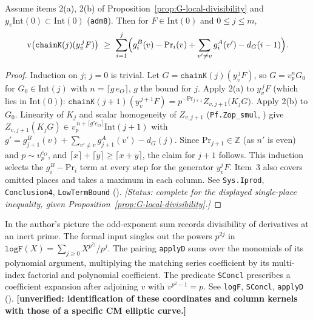 \begin{lemma}\label{lem:G-one-y-per-column}
Assume items 2(a), 2(b) of Proposition~\ref{prop:G-local-divisibility} and $y_v\mathrm{Int}(0)\subset\mathrm{Int}(0)$
(\texttt{adm8}). Then for $F\in\mathrm{Int}(0)$ and $0\le j\le m$,
\[
  \mathrm v\bigl(\texttt{chainK}(j)(y_v^{\,j}F)\bigr)\ \ge\ \sum_{i=1}^{j}\Bigl(g^B_i(v)-\mathrm{Pr}_i(v)+\sum_{v'\ne v}g^A_i(v')-d_G(i-1)\Bigr).
\]
\end{lemma}
\begin{proof}
Induction on $j$; $j=0$ is trivial. Let $G=\texttt{chainK}(j)(y_v^{\,j}F)$, so
$G=v_p^nG_0$ for $G_0\in\mathrm{Int}(j)$ with $n=\lceil g\,e_O\rceil$, $g$ the bound for $j$. Apply 2(a) to $y_v^{\,j}F$
(which lies in $\mathrm{Int}(0)$):
$\texttt{chainK}(j+1)(y_v^{\,j+1}F)=p^{-\mathrm{Pr}_{j+1}}Z_{v,j+1}\bigl(K_j G\bigr)$. Apply 2(b) to $G_0$. Linearity of $K_j$ and scalar homogeneity of $Z_{v,j+1}$
(\texttt{Pf.Zop\_smul}, ) give $Z_{v,j+1}(K_jG)\in v_p^{\,n+\lceil g'e_O\rceil}\mathrm{Int}(j+1)$ with
$g'=g^B_{j+1}(v)+\sum_{v'\ne v}g^A_{j+1}(v')-d_G(j)$. Since $\mathrm{Pr}_{j+1}\in\mathbb Z$ (as $n'$ is even) and
$p\sim v_p^{e_O}$, and $\lceil x\rceil+\lceil y\rceil\ge\lceil x+y\rceil$, the claim for $j+1$ follows.
This induction selects the $g^B_i-\mathrm{Pr}_i$ term at every step for the generator $y_v^jF$.
Item~3 also covers omitted places and takes a maximum in each column. See \texttt{Sys.Iprod},
\texttt{Conclusion4}, \texttt{LowTermBound} ().
\textit{[Status: complete for the displayed single-place inequality, given Proposition~\ref{prop:G-local-divisibility}.]}
\end{proof}

\begin{remark}\label{rem:G-supersingular}
In the author's picture the odd-exponent sum records divisibility of derivatives at an inert prime.
The formal input singles out the powers $p^{2j}$ in
$\texttt{logF}(X)=\sum_{j\ge0}X^{p^{2j}}/p^j$. The pairing \texttt{applyD} sums over the
monomials of its polynomial argument, multiplying the matching series coefficient by its multi-index
factorial and polynomial coefficient. The predicate \texttt{SConcl} prescribes a coefficient
expansion after adjoining $v$ with $v^{p^2-1}=p$.
See \texttt{logF}, \texttt{SConcl}, \texttt{applyD} ().
\textbf{[unverified: identification of these coordinates and column kernels with those of a specific CM elliptic curve.]}
\end{remark}

